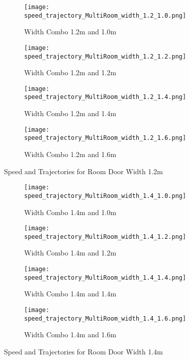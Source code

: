 \begin{figure}[h]
    \centering
    \begin{subfigure}[b]{.45\linewidth}
        \texttt{[image: 
            speed\_trajectory\_MultiRoom\_width\_1.2\_1.0.png]}
        \caption{Width Combo 1.2m and 1.0m}
        \label{fig:width_combo_1.2_1.0m}
    \end{subfigure}
    \begin{subfigure}[b]{.45\linewidth}
        \texttt{[image: 
            speed\_trajectory\_MultiRoom\_width\_1.2\_1.2.png]}
        \caption{Width Combo 1.2m and 1.2m}
        \label{fig:width_combo_1.2_1.2m}
    \end{subfigure}

    \begin{subfigure}[b]{.45\linewidth}
        \texttt{[image: 
            speed\_trajectory\_MultiRoom\_width\_1.2\_1.4.png]}
        \caption{Width Combo 1.2m and 1.4m}
        \label{fig:width_combo_1.2_1.4m}
    \end{subfigure}
    \begin{subfigure}[b]{.45\linewidth}
        \texttt{[image: 
            speed\_trajectory\_MultiRoom\_width\_1.2\_1.6.png]}
        \caption{Width Combo 1.2m and 1.6m}
        \label{fig:width_combo_1.2_1.6m}
    \end{subfigure}

    \caption{Speed and Trajectories for Room Door Width 1.2m}
    \label{fig:width_combo_1.2_x}
\end{figure}

\begin{figure}[h]
    \centering
        \begin{subfigure}[b]{.45\linewidth}
        \texttt{[image: 
            speed\_trajectory\_MultiRoom\_width\_1.4\_1.0.png]}
        \caption{Width Combo 1.4m and 1.0m}
        \label{fig:width_combo_1.4_1.0m}
    \end{subfigure}
    \begin{subfigure}[b]{.45\linewidth}
        \texttt{[image: 
            speed\_trajectory\_MultiRoom\_width\_1.4\_1.2.png]}
        \caption{Width Combo 1.4m and 1.2m}
        \label{fig:width_combo_1.4_1.2m}
    \end{subfigure}

    \begin{subfigure}[b]{.45\linewidth}
        \texttt{[image: 
            speed\_trajectory\_MultiRoom\_width\_1.4\_1.4.png]}
        \caption{Width Combo 1.4m and 1.4m}
        \label{fig:width_combo_1.4_1.4m}
    \end{subfigure}
    \begin{subfigure}[b]{.45\linewidth}
        \texttt{[image: 
            speed\_trajectory\_MultiRoom\_width\_1.4\_1.6.png]}
        \caption{Width Combo 1.4m and 1.6m}
        \label{fig:width_combo_1.4_1.6m}
    \end{subfigure}
    
    \caption{Speed and Trajectories for Room Door Width 1.4m}
    \label{fig:width_combo_1.4_x}
\end{figure}

